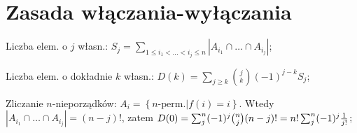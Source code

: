\section{Zasada włączania-wyłączania}

\entry
Liczba elem. o $j$ własn.: $S_j =
  \sum_{1 \leq i_1 < \dots < i_j \leq n} |A_{i_1} \cap \dots \cap A_{i_j}|$;

\entry
Liczba elem. o dokładnie $k$ własn.:
  $D(k) = \sum_{j\geq k} \binom{j}{k} (-1)^{j-k}S_j$;

\entry
Zliczanie $n$-nieporządków: $A_i = \left\{n\text{-perm.} | f(i) = i \right\}$.
  Wtedy $|A_{i_1} \cap \dots \cap A_{i_j}| = (n-j)!$, zatem
  $D(0) = \sum^n_j(-1)^j\binom{n}{j}(n-j)!=n!\sum^n_j(-1)^j{1 \over j!}$;
